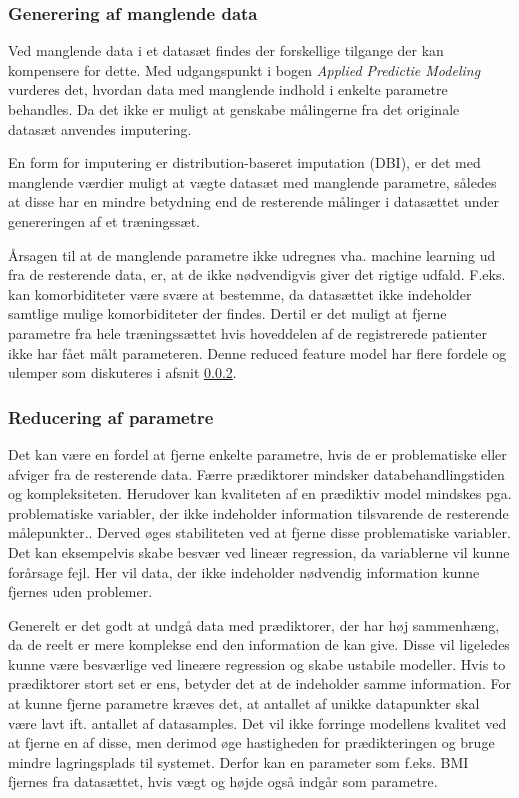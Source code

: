\subsubsection{Generering af manglende data}
Ved manglende data i et datasæt findes der forskellige tilgange der kan kompensere for dette. Med udgangspunkt i bogen \textit{Applied Predictie Modeling} vurderes det, hvordan data med manglende indhold i enkelte parametre behandles\cite{Saar2007}. Da det ikke er muligt at genskabe målingerne fra det originale datasæt anvendes imputering. 




En form for imputering er distribution-baseret imputation (DBI), er det med manglende værdier muligt at vægte datasæt med manglende parametre, således at disse har en mindre betydning end de resterende målinger i datasættet under genereringen af et træningssæt. 



Årsagen til at de manglende parametre ikke udregnes vha. machine learning ud fra de resterende data, er, at de ikke nødvendigvis giver det rigtige udfald. F.eks. kan komorbiditeter være svære at bestemme, da datasættet ikke indeholder samtlige mulige komorbiditeter der findes. Dertil er det muligt at fjerne parametre fra hele træningssættet hvis hoveddelen af de registrerede patienter ikke har fået målt parameteren. Denne reduced feature model har flere fordele og ulemper som diskuteres i afsnit \ref{reduceringafparametre}. 

\subsubsection{Reducering af parametre}\label{reduceringafparametre}
Det kan være en fordel at fjerne enkelte parametre, hvis de er problematiske eller afviger fra de resterende data. Færre prædiktorer mindsker databehandlingstiden og kompleksiteten. Herudover kan kvaliteten af en prædiktiv model mindskes pga. problematiske variabler, der ikke indeholder information tilsvarende de resterende målepunkter.. Derved øges stabiliteten ved at fjerne disse problematiske variabler. Det kan eksempelvis skabe besvær ved lineær regression, da variablerne vil kunne forårsage fejl. Her vil data, der ikke indeholder nødvendig information kunne fjernes uden problemer.\cite{Kuhn2013}
 
Generelt er det godt at undgå data med prædiktorer, der har høj sammenhæng, da de reelt er mere komplekse end den information de kan give. Disse vil ligeledes kunne være besværlige ved lineære regression og skabe ustabile modeller. Hvis to prædiktorer stort set er ens, betyder det at de indeholder samme information. For at kunne fjerne parametre kræves det, at antallet af unikke datapunkter skal være lavt ift. antallet af datasamples. Det vil ikke forringe modellens kvalitet ved at fjerne en af disse, men derimod øge hastigheden for prædikteringen og bruge mindre lagringsplads til systemet. Derfor kan en parameter som f.eks. BMI fjernes fra datasættet, hvis vægt og højde også indgår som parametre.\cite{Kuhn2013}


